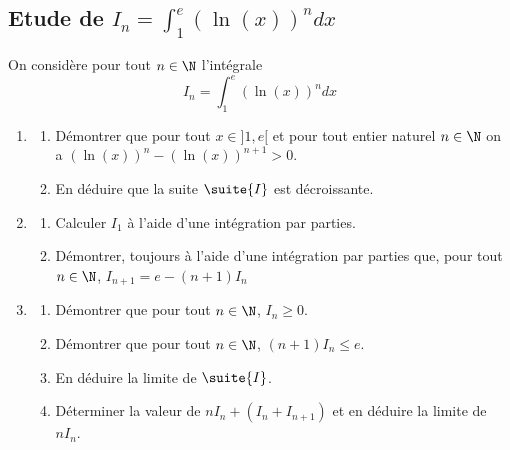 \subsection{Etude de $I_n=\int_1^e (\ln(x))^n dx$ }

\begin{exercice}
On considère pour tout $n\in \N$ l'intégrale 
$$I_n = \int_1^e (\ln(x))^n dx$$

\begin{enumerate}
\item \begin{enumerate}
\item Démontrer que pour tout $x\in ]1,e[ $ et pour tout entier naturel $n\in \N$ on  a $ (\ln(x))^n  - (\ln(x))^{n+1} >0$.
\item En déduire que la suite $\suite{I}$ est décroissante.
\end{enumerate}
\item \begin{enumerate}
\item Calculer $I_1$ à l'aide d'une intégration par parties. 
\item Démontrer, toujours à l'aide d'une intégration par parties que, pour tout $n\in \N$, $I_{n+1} = e- (n+1)I_n$
\end{enumerate}
\item \begin{enumerate}
\item Démontrer que pour tout $n\in \N$, $I_n\geq0$.
\item Démontrer que pour tout $n\in \N$, $(n+1) I_n\leq e$.
\item En déduire la limite de $\suite{I}$. 
\item Déterminer la valeur de $nI_n +(I_n+I_{n+1})$  et en déduire la limite de $nI_n$. 
\end{enumerate}
\end{enumerate}
\end{exercice}

